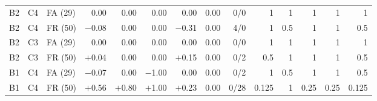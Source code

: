 \begin{table}[t]
\begin{tabular}{lllrrrrrrrrrrr}
B2 & C4 & FA (29) & 0.00 & 0.00 & 0.00 & 0.00 & 0.00 & 0/0 & 1 & 1 & 1 & 1 & 1 \\
B2 & C4 & FR (50) & \ensuremath{-}0.08 & 0.00 & 0.00 & \ensuremath{-}0.31 & 0.00 & 4/0 & 1 & 0.5 & 1 & 1 & 0.5 \\
B2 & C3 & FA (29) & 0.00 & 0.00 & 0.00 & 0.00 & 0.00 & 0/0 & 1 & 1 & 1 & 1 & 1 \\
B2 & C3 & FR (50) & \ensuremath{+}0.04 & 0.00 & 0.00 & \ensuremath{+}0.15 & 0.00 & 0/2 & 0.5 & 1 & 1 & 1 & 0.5 \\
B1 & C4 & FA (29) & \ensuremath{-}0.07 & 0.00 & \ensuremath{-}1.00 & 0.00 & 0.00 & 0/2 & 1 & 0.5 & 1 & 1 & 0.5 \\
B1 & C4 & FR (50) & \ensuremath{+}0.56 & \ensuremath{+}0.80 & \ensuremath{+}1.00 & \ensuremath{+}0.23 & 0.00 & 0/28 & 0.125 & 1 & 0.25 & 0.25 & 0.125 \\
\bottomrule\end{tabular}\end{table}
